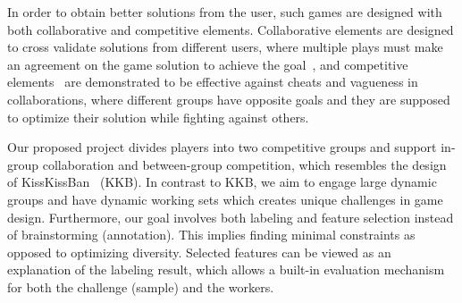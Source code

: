 In order to obtain better solutions from the user, such games are designed with both collaborative and competitive elements. Collaborative elements are designed to cross validate solutions from different users, where multiple plays must make an agreement on the game solution to achieve the goal~\cite{vonAhn:2006:PGL:1124772.1124782}, and competitive elements~\cite{ho2009kisskissban} are demonstrated to be effective against cheats and vagueness in collaborations, where different groups have opposite goals and they are supposed to optimize their solution while fighting against others.

Our proposed project divides players into two competitive groups and support in-group collaboration and between-group competition, which resembles the design of KissKissBan~\cite{ho2009kisskissban} (KKB). In contrast to KKB, we aim to engage large dynamic groups and have dynamic working sets which creates unique challenges in game design. Furthermore, our goal involves both labeling and feature selection instead of brainstorming (annotation). This implies finding minimal constraints as opposed to optimizing diversity. Selected features can be viewed as an explanation of the labeling result, which allows a built-in evaluation mechanism for both the challenge (sample) and the workers. 

